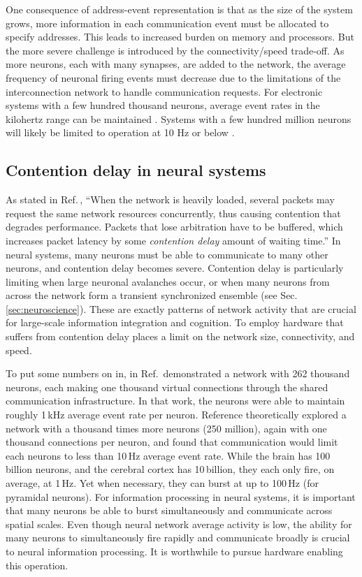 \documentclass[twocolumn]{article}
\begin{document}
One consequence of address-event representation is that as the size of the system grows, more information in each communication event must be allocated to specify addresses. This leads to increased burden on memory and processors. But the more severe challenge is introduced by the connectivity/speed trade-off. As more neurons, each with many synapses, are added to the network, the average frequency of neuronal firing events must decrease due to the limitations of the interconnection network to handle communication requests. For electronic systems with a few hundred thousand neurons, average event rates in the kilohertz range can be maintained \cite{}. Systems with a few hundred million neurons will likely be limited to operation at 10 Hz or below \cite{}.

\subsection{Contention delay in neural systems}
As stated in Ref.\,\cite{hepa2012}, ``When the network is heavily loaded, several packets may request the same network resources concurrently, thus causing contention that degrades performance. Packets that lose arbitration have to be buffered, which increases packet latency by some \textit{contention delay} amount of waiting time.'' In neural systems, many neurons must be able to communicate to many other neurons, and contention delay becomes severe. Contention delay is particularly limiting when large neuronal avalanches occur, or when many neurons from across the network form a transient synchronized ensemble (see Sec.\,\ref{sec:neuroscience}). These are exactly patterns of network activity that are crucial for large-scale information integration and cognition. To employ hardware that suffers from contention delay places a limit on the network size, connectivity, and speed. 

To put some numbers on in, in Ref.\,\cite{payu2017} demonstrated a network with 262 thousand neurons, each making one thousand virtual connections through the shared communication infrastructure. In that work, the neurons were able to maintain roughly 1\,kHz average event rate per neuron. Reference \cite{kuwa2017} theoretically explored a network with a thousand times more neurons (250 million), again with one thousand connections per neuron, and found that communication would limit each neurons to less than 10\,Hz average event rate. While the brain has 100\,billion neurons, and the cerebral cortex has 10\,billion, they each only fire, on average, at 1\,Hz. Yet when necessary, they can burst at up to 100\,Hz (for pyramidal neurons). For information processing in neural systems, it is important that many neurons be able to burst simultaneously and communicate across spatial scales. Even though neural network average activity is low, the ability for many neurons to simultaneously fire rapidly and communicate broadly is crucial to neural information processing. It is worthwhile to pursue hardware enabling this operation. 
\end{document}
